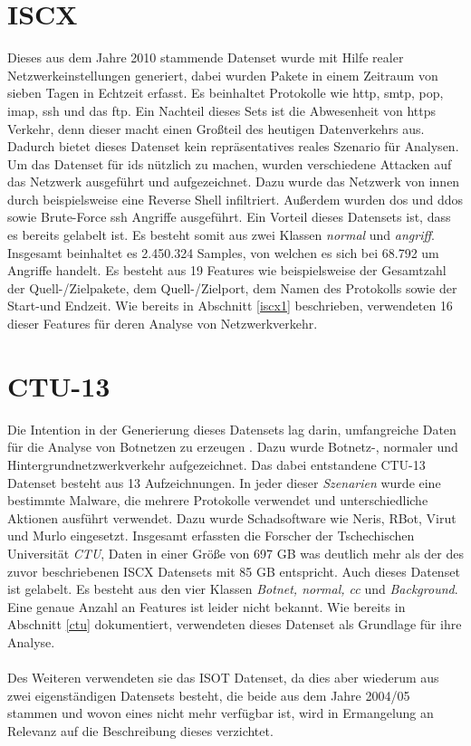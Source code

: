\documentclass[
    12pt, %
    DIV10,
    ngerman, %
    a4paper, %
    oneside, %
    titlepage, %
    parskip=half, %
    headings=normal, %
    listof=totoc, %
    bibliography=totoc, %
    index=totoc, %
    captions=tableheading, %
    final %
]{scrreprt}
\begin{document}
\section{ISCX}
Dieses aus dem Jahre 2010 stammende Datenset wurde mit Hilfe realer Netzwerkeinstellungen generiert, dabei wurden Pakete in einem Zeitraum von sieben Tagen in Echtzeit erfasst. Es beinhaltet Protokolle wie \ac{http}, \ac{smtp}, \ac{pop}, \ac{imap}, \ac{ssh} und das \ac{ftp}. Ein Nachteil dieses Sets ist die Abwesenheit von \ac{https} Verkehr, denn dieser macht einen Großteil des heutigen Datenverkehrs aus. Dadurch bietet dieses Datenset kein repräsentatives reales Szenario für Analysen. Um das Datenset für \ac{ids} nützlich zu machen, wurden verschiedene Attacken auf das Netzwerk ausgeführt und aufgezeichnet. Dazu wurde das Netzwerk von innen durch beispielsweise eine Reverse Shell infiltriert. Außerdem wurden \ac{dos} und \ac{ddos} sowie Brute-Force \ac{ssh} Angriffe ausgeführt. Ein Vorteil dieses Datensets ist, dass es bereits gelabelt ist. Es besteht somit aus zwei Klassen \emph{normal} und \emph{angriff}. Insgesamt beinhaltet es 2.450.324 Samples, von welchen es sich bei 68.792 um Angriffe handelt. Es besteht aus 19 Features wie beispielsweise der Gesamtzahl der Quell-/Zielpakete, dem Quell-/Zielport, dem Namen des Protokolls sowie der Start-und Endzeit. Wie bereits in Abschnitt \ref{iscx1} beschrieben, verwendeten \textcite{Aldwairi2018} 16 dieser Features für deren Analyse von Netzwerkverkehr.
\section{CTU-13}
Die Intention in der Generierung dieses Datensets lag darin, umfangreiche Daten für die Analyse von Botnetzen zu erzeugen \parencite{garcia2014empirical}. Dazu wurde Botnetz-, normaler und Hintergrundnetzwerkverkehr aufgezeichnet. Das dabei entstandene CTU-13 Datenset besteht aus 13 Aufzeichnungen. In jeder dieser \emph{Szenarien} wurde eine bestimmte Malware, die mehrere Protokolle verwendet und unterschiedliche Aktionen ausführt verwendet. Dazu wurde Schadsoftware wie Neris, RBot, Virut und Murlo eingesetzt. Insgesamt erfassten die Forscher der Tschechischen Universität \emph{CTU}, Daten in einer Größe von 697 GB was deutlich mehr als der des zuvor beschriebenen ISCX Datensets mit 85 GB entspricht. Auch dieses Datenset ist gelabelt. Es besteht aus den vier Klassen \emph{Botnet, normal, \ac{cc}} und \emph{Background}. Eine genaue Anzahl an Features ist leider nicht bekannt.
Wie bereits in Abschnitt \ref{ctu} dokumentiert, verwendeten \textcite{Mathur2018} dieses Datenset als Grundlage für ihre Analyse.\\\\
Des Weiteren verwendeten sie das ISOT Datenset, da dies aber wiederum aus zwei eigenständigen Datensets besteht, die beide aus dem Jahre 2004/05 stammen und wovon eines nicht mehr verfügbar ist, wird in Ermangelung an Relevanz auf die Beschreibung dieses verzichtet.
\end{document}
